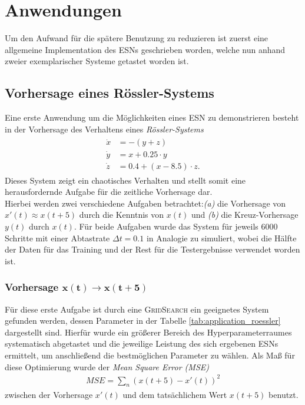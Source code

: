 \section{Anwendungen}
\label{chp:applications}
Um den Aufwand für die spätere Benutzung zu reduzieren ist zuerst eine allgemeine Implementation des \textsc{ESN}s geschrieben worden, welche nun anhand zweier exemplarischer Systeme getastet worden ist.

\subsection{Vorhersage eines Rössler-Systems}
Eine erste Anwendung um die Möglichkeiten eines \textsc{ESN} zu demonstrieren besteht in der Vorhersage des Verhaltens eines \textit{Rössler-Systems}
\begin{align}
\label{eq:application_roessler_pde}
\begin{split}
\dot{x} &= -(y+z)\\
\dot{y} &= x + 0.25 \cdot  y\\
\dot{z} &= 0.4 + (x - 8.5)\cdot z.
\end{split}
\end{align}
Dieses System zeigt ein chaotisches Verhalten und stellt somit eine herausfordernde Aufgabe für die zeitliche Vorhersage dar.\\
Hierbei werden zwei verschiedene Aufgaben betrachtet:\textit{(a)} die Vorhersage von $x'(t) \approx x(t+5)$ durch die Kenntnis von $x(t)$ und \textit{(b)} die Kreuz-Vorhersage $y(t)$ durch $x(t)$. Für beide Aufgaben wurde das System für jeweils $6000$ Schritte mit einer Abtastrate $\Delta t = 0.1$ in Analogie zu \cite{parlitz2005} simuliert, wobei die Hälfte der Daten für das Training und der Rest für die Testergebnisse verwendet worden ist.

\subsubsection[Vorhersage $x(t) \rightarrow x(t+5)$]{Vorhersage $\pmb{x(t) \rightarrow x(t+5)}$}
Für diese erste Aufgabe ist durch eine \textsc{GridSearch} ein geeignetes System gefunden werden, dessen Parameter in der Tabelle \ref{tab:application_roessler} dargestellt sind. Hierfür wurde ein größerer Bereich des Hyperparameterraumes systematisch abgetastet und die jeweilige Leistung des sich ergebenen \textsc{ESN}s ermittelt, um anschließend die bestmöglichen Parameter zu wählen. Als Maß für diese Optimierung wurde der \textit{Mean Square Error (MSE)}
\begin{align}
MSE = \sum_n \left(x(t+5) - x'(t) \right)^2
\end{align}
zwischen der Vorhersage $x'(t)$ und dem tatsächlichem Wert $x(t+5)$ benutzt.

